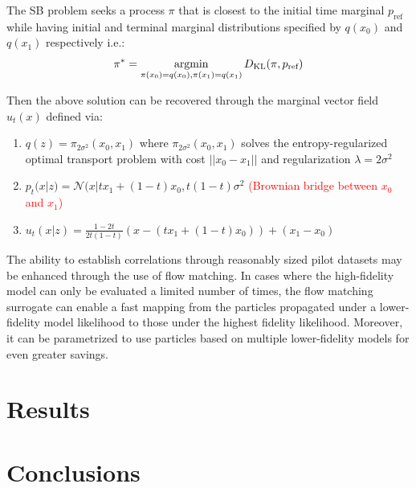 \documentclass[12pt]{article}
\renewcommand{\[}{\left[}
\renewcommand{\]}{\right]}
\renewcommand{\(}{\left(}
\renewcommand{\)}{\right)}
\newcommand{\CN}{\mathcal{N}}
\newcommand{\argmin}{\operatornamewithlimits{argmin}}
\newcommand{\DKL}{D_{\mathrm{KL}}}
\begin{document}
The SB problem seeks a process $\pi$ that is closest to the initial time marginal $p_{\text{ref}}$ while having initial and terminal marginal distributions specified by $q(x_0)$ and $q(x_1)$ respectively i.e.:
\begin{equation*}
\pi^{\ast} = \argmin_{\pi(x_0) = q(x_0), \pi(x_1)=q(x_1)} \DKL(\pi, p_{\text{ref}})
\end{equation*}

Then the above solution can be recovered through the marginal vector field $u_t(x)$ defined via:

\begin{enumerate}
\item $q(z) = \pi_{2\sigma^2}(x_0, x_1)$ where $\pi_{2\sigma^2}(x_0, x_1)$ solves the entropy-regularized optimal transport problem with cost $||x_0 - x_1||$ and regularization $\lambda = 2\sigma^2$

\item $p_t(x|z) = \CN(x | tx_1 + (1 - t)x_0, t(1-t)\sigma^2$ \textcolor{red}{(Brownian bridge between $x_0$ and $x_1$)}

\item $u_t(x|z) = \frac{1 - 2t}{2t(1-t)}\left(x - (tx_1 + (1 - t) x_0) \right) + (x_1 - x_0)$
\end{enumerate}

The ability to establish correlations through reasonably sized pilot datasets may be enhanced through the use of flow matching. 
In cases where the high-fidelity model can only be evaluated a limited number of times, the flow matching surrogate can enable a fast mapping from the particles propagated under a lower-fidelity model likelihood to those under the highest fidelity likelihood. 
Moreover, it can be parametrized to use particles based on multiple lower-fidelity models for even greater savings.

\section{Results}

\section{Conclusions}


\end{document}
